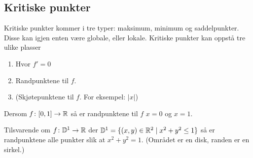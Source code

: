 \begin{frame}
  \subsection{Kritiske punkter}\label{subsec:Kritiske-punkter}
  Kritiske punkter kommer i tre typer: maksimum, minimum og saddelpunkter.
  Disse kan igjen enten være globale, eller lokale.
  Kritiske punkter kan oppstå tre ulike plasser
  \begin{enumerate}
    \item Hvor $f' = 0$
    \item Randpunktene til $f$.
    \item (Skjøtepunktene til $f$. For eksempel: $|x|$)
  \end{enumerate}
  \begin{example}
  Dersom $f \colon [0,1] \to \mathbb{R}$ så er randpunktene til $f$
  $x=0$ og $x=1$.
\end{example}
  \begin{example}
Tilsvarende om $f \colon \mathbb{D}^{1} \to \mathbb{R}$ der
  $\mathbb{D}^1 = \{(x,y) \in \mathbb{R}^2 \mid x^2 + y^2 \leq 1\}$ så er randpunktene
  alle punkter slik at $x^2 + y^2=1$. (Området er en disk, randen er en sirkel.)
\end{example}
\end{frame}

